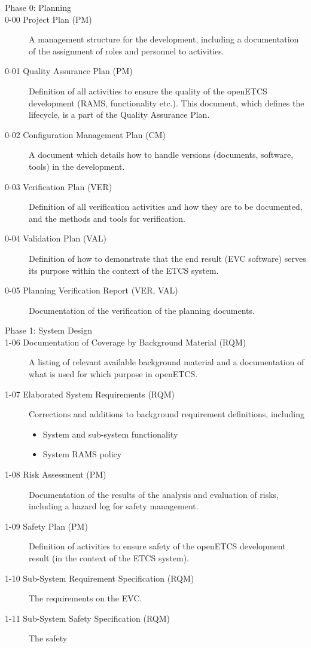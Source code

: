 \documentclass{template/openetcs_article}
\begin{document}
\begin{description}
\item[Phase 0: Planning]
\item[0-00 Project Plan (PM)] A management structure for the development,
  including a documentation of the assignment of roles and personnel to activities.
\item[0-01 Quality Assurance Plan (PM)] Definition of all activities to
  ensure the quality of the openETCS development (RAMS, functionality
  etc.). This document, which defines the lifecycle, is a part of the Quality
  Assurance Plan.
\item[0-02 Configuration Management Plan (CM)] A document which details how to handle
  versions (documents, software, tools) in the development.
\item[0-03 Verification Plan (VER)] Definition of all verification
  activities and how they are to be documented, and the methods and
  tools for verification.
\item[0-04 Validation Plan (VAL)] Definition of how to demonstrate that the end result (EVC
  software) serves its purpose within the context of the ETCS system.
\item[0-05 Planning Verification Report (VER, VAL)]
  Documentation of the verification of the planning documents.
\item[Phase 1: System Design] 
\item[1-06 Documentation of Coverage by Background Material (RQM)] A
  listing of relevant available background material and a
  documentation of what is used for which purpose in openETCS.
\item[1-07 Elaborated System Requirements (RQM)] Corrections and additions to
  background requirement definitions, including
  \begin{itemize}
  \item System and sub-system functionality
  \item System RAMS policy
  \end{itemize}
\item[1-08 Risk Assessment (PM)] Documentation of the results of the
  analysis and evaluation of risks, including a hazard log for safety management.
\item[1-09 Safety Plan (PM)] Definition of activities to ensure safety of
  the openETCS development result (in the context of the ETCS system). 
\item[1-10 Sub-System Requirement Specification (RQM)] The
  requirements on the EVC.
\item[1-11 Sub-System Safety Specification (RQM)] The safety

\end{description}
\end{document}
